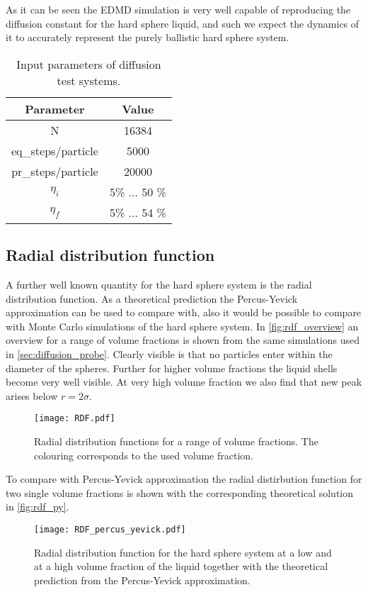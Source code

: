 As it can be seen the EDMD simulation is very well capable of reproducing the diffusion constant for the hard sphere liquid, and such we expect the dynamics of it to accurately represent the purely ballistic hard sphere system.\\


\begin{table}[h]
\centering
\begin{tabular}{c|c}
Parameter & Value \\ \hline
N & 16384 \\
eq\_steps/particle & 5000 \\
pr\_steps/particle & 20000 \\
$\eta_i$ & 5\% ... 50 \% \\
$\eta_f$ & 5\% ... 54 \% \\
\end{tabular}
\caption{Input parameters of diffusion test systems.}
\label{tab:system_diffusion}
\end{table}





\subsection{Radial distribution function}
\label{sec:RDF_prob}
A further well known quantity for the hard sphere system is the radial distribution function. As a theoretical prediction the Percus-Yevick approximation can be used to compare with, also it would be possible to compare with Monte Carlo simulations of the hard sphere system. In \autoref{fig:rdf_overview} an overview for a range of volume fractions is shown from the same simulations used in \autoref{sec:diffusion_probe}. Clearly visible is that no particles enter within the diameter of the spheres. Further for higher volume fractions the liquid shells become very well visible. At very high volume fraction we also find that  new peak arises below $r = 2 \sigma$.
\begin{figure}[h]
\centering
\texttt{[image: RDF.pdf]}
\caption{Radial distribution functions for a range of volume fractions. The colouring corresponds to the used volume fraction.}
\label{fig:rdf_overview}
\end{figure}

To compare with Percus-Yevick approximation the radial distirbution function for two single volume fractions is shown with the corresponding theoretical solution in \autoref{fig:rdf_py}.
\begin{figure}[h]
\centering
\texttt{[image: RDF\_percus\_yevick.pdf]}
\caption{Radial distribution function for the hard sphere system at a low and at a high volume fraction of the liquid together with the theoretical prediction from the Percus-Yevick approximation.}
\label{fig:rdf_py}
\end{figure}

